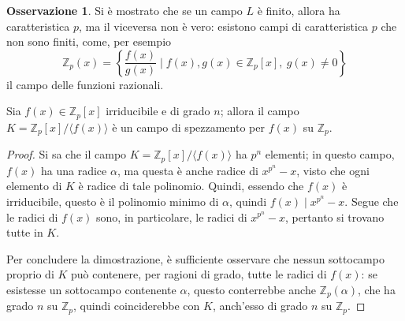 \documentclass[11pt, a4paper]{scrartcl}
\theoremstyle{definition}
\numberwithin{esempio}{section}
\theoremstyle{definition}
\newtheorem{obs}{Osservazione}
\numberwithin{obs}{section}
\numberwithin{nota}{section}
\numberwithin{equation}{subsection}
\begin{document}
\begin{obs}
	Si \`e mostrato che se un campo $L$ \`e finito, allora ha caratteristica $p$, ma il viceversa non \`e vero: esistono campi di caratteristica $p$ che non sono finiti, come, per esempio
	\[
		\mathbb{Z}_p(x) = \left\{ \frac{f(x)}{g(x)} \mid f(x),g(x) \in \mathbb{Z}_p[x], \ g(x) \neq 0 \right\} 
	\] 
	il campo delle funzioni razionali.
\end{obs}
\begin{teorema}
	{}{}
	Sia $f(x) \in \mathbb{Z}_p[x]$ irriducibile e di grado $n$; allora il campo $K = \mathbb{Z}_p[x] / \langle f(x) \rangle$ \`e un campo di spezzamento per $f(x)$ su $\mathbb{Z}_p$.
	\begin{proof}
		Si sa che il campo $K = \mathbb{Z}_p[x] / \langle f(x) \rangle$ ha $p^n$ elementi; in questo campo, $f(x)$ ha una radice $\alpha $, ma questa \`e anche radice di $x^{p^n} -x$, visto che ogni elemento di $K$ \`e radice di tale polinomio.
		Quindi, essendo che $f(x)$ \`e irriducibile, questo \`e il polinomio minimo di $\alpha $, quindi $f(x)  \mid  x^{p^n} -x$.
		Segue che le radici di $f(x)$ sono, in particolare, le radici di $x^{p^n} -x$, pertanto si trovano tutte in $K$.

		Per concludere la dimostrazione, \`e sufficiente osservare che nessun sottocampo proprio di $K$ pu\`o contenere, per ragioni di grado, tutte le radici di $f(x)$: se esistesse un sottocampo contenente $\alpha $, questo conterrebbe anche $\mathbb{Z}_p(\alpha )$, che ha grado $n$ su $\mathbb{Z}_p$, quindi coinciderebbe con $K$, anch'esso di grado $n$ su $\mathbb{Z}_p$.
	\end{proof}
\end{teorema}
\end{document}
